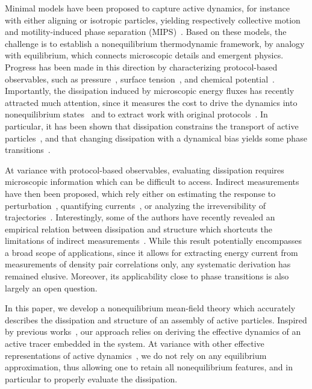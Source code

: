 \documentclass[superscriptaddress, twocolumn, prl, longbibliography, nofootinbib]{revtex4-1}
\begin{document}
Minimal models have been proposed to capture active dynamics, for instance with either aligning or isotropic particles, yielding respectively collective motion~\cite{Vicsek1995, Chate2020} and motility-induced phase separation (MIPS)~\cite{Fily2012, Cates2015}. Based on these models, the challenge is to establish a nonequilibrium thermodynamic framework, by analogy with equilibrium, which connects microscopic details and emergent physics. Progress has been made in this direction by characterizing protocol-based observables, such as pressure~\cite{Marchetti2014, Brady2014, Solon2015}, surface tension~\cite{Speck2015, Paliwal2017, Zakine2020}, and chemical potential~\cite{Paliwal2018, Guioth2019}. Importantly, the dissipation induced by microscopic energy fluxes has recently attracted much attention, since it measures the cost to drive the dynamics into nonequilibrium states~\cite{Shim2016, Suma2017, Junco2018, Spinney2018, Murrell2018, Murrell2019, Markovich2020} and to extract work with original protocols~\cite{Zakine2017, Martin2018, Pietzonka2019, Liao2020, Ekeh2020, Kroy2020}. In particular, it has been shown that dissipation constrains the transport of active particles~\cite{Suri2019, Suri2020}, and that changing dissipation with a dynamical bias yields some phase transitions~\cite{Nemoto2019, GrandPre2020}.


At variance with protocol-based observables, evaluating dissipation requires microscopic information which can be difficult to access. Indirect measurements have then been proposed, which rely either on estimating the response to perturbation~\cite{Sasa2005, Toyabe2010, Ahmed2016, Nardini2017, Mizuno2018}, quantifying currents~\cite{Barato2015, Gingrich2016, Gladrow2016, Li2019}, or analyzing the irreversibility of trajectories~\cite{Roldan2018, Parrondo2019}. Interestingly, some of the authors have recently revealed an empirical relation between dissipation and structure which shortcuts the limitations of indirect measurements~\cite{Suri2019}. While this result potentially encompasses a broad scope of applications, since it allows for extracting energy current from measurements of density pair correlations only, any systematic derivation has remained elusive. Moreover, its applicability close to phase transitions is also  largely an open question.


In this paper, we develop a nonequilibrium mean-field theory which accurately describes the dissipation and structure of an assembly of active particles. Inspired by previous works~\cite{Demery2011, Demery2014}, our approach relies on deriving the effective dynamics of an active tracer embedded in the system. At variance with other effective representations of active dynamics~\cite{Maggi2015, Rein2016, Wittmann2017}, we do not rely on any equilibrium approximation, thus allowing one to retain all nonequilibrium features, and in particular to properly evaluate the dissipation.
\end{document}
